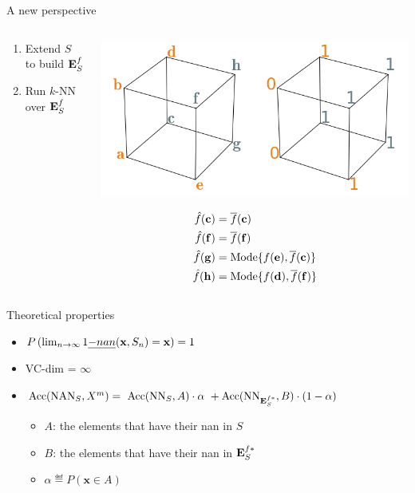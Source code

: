 \documentclass{beamer}
\begin{document}
\begin{frame}{A new perspective}
  \begin{columns}
    \begin{column}{.5\textwidth}
      \begin{enumerate}
        \item Extend $S$ to build $\mathbf{E}_{S}^{f}$
        \item Run $k$-NN over $\mathbf{E}_{S}^{f}$
      \end{enumerate}
    \end{column}
    \begin{column}{.5\textwidth}
      \begin{center}
        \includegraphics[width=.8\textwidth]{figures/ae_example2_pres.png}
      \end{center}
        \begin{align*}
          \hat{f}(\mathbf{c}) &= \overline{f}(\mathbf{c})\\
          \hat{f}(\mathbf{f}) &= \overline{f}(\mathbf{f})\\
          \hat{f}(\mathbf{g}) &= \text{Mode}\{f(\mathbf{e}), \overline{f}(\mathbf{c})\}\\
          \hat{f}(\mathbf{h}) &= \text{Mode}\{f(\mathbf{d}), \overline{f}(\mathbf{f})\}
        \end{align*}
    \end{column}
  \end{columns}
\end{frame}

\begin{frame}{Theoretical properties}
  \begin{itemize}
    \item $P\left(\lim_{n \to \infty} 1\emph{-nan}(\mathbf{x}, S_n) =
      \mathbf{x}\right) = 1$
    \item VC-dim = $\infty$
    \item $\mbox{Acc}(\mbox{NAN}_S, X^m) = ~\mbox{Acc}(\text{NN}_S, A) \cdot \alpha ~ +
      \mbox{Acc}(\text{NN}_{\mathbf{E}_{S}^{f*}}, B) \cdot (1 - \alpha) $
    \begin{itemize}
    \item $A$: the elements that have their nan in $S$
    \item $B$: the elements that have their nan in $\mathbf{E}_{S}^{f*}$
    \item $\alpha \eqdef P(\mathbf{x} \in A)$
  \end{itemize}
  \end{itemize}
\end{frame}
\end{document}
